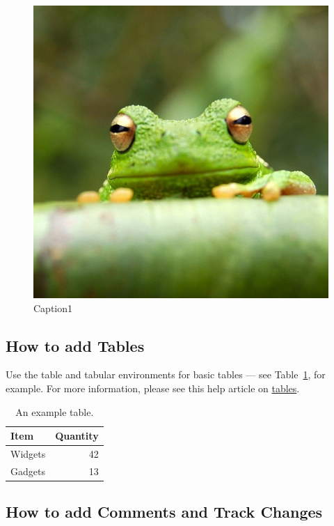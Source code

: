 ﻿\documentclass{article}
\begin{document}
    \begin{figure}
        \includegraphics[width=0.9\linewidth]{frog.jpg}
        \caption{Caption1}
        \label{fig:wrapfig}
    \end{figure}

    \subsection{How to add Tables}

    Use the table and tabular environments for basic tables --- see Table~\ref{tab:widgets}, for example. For more information, please see this help article on \href{https://www.overleaf.com/learn/latex/tables}{tables}.

    \begin{table}
        \centering
        \begin{tabular}{l|r}
            Item    & Quantity \\\hline
            Widgets & 42       \\
            Gadgets & 13
        \end{tabular}
        \caption{\label{tab:widgets}An example table.}
    \end{table}

    \subsection{How to add Comments and Track Changes}
\end{document}
